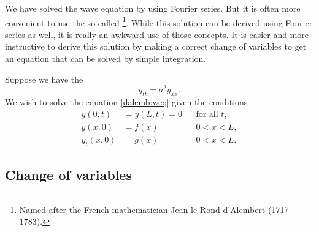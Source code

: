 
We have solved the wave equation by using Fourier series.  But it is often
more convenient to use the so-called
\emph{}%
\footnote{Named after the French mathematician
\href{http://en.wikipedia.org/wiki/D\%27Alembert}{Jean le Rond d'Alembert}
(1717--1783).}.
While this solution can be derived using Fourier series as well, it
is really an awkward use of those concepts.  It is easier and more
instructive to derive this
solution by making a correct change of variables to get an equation that
can be solved by simple integration.

Suppose we have the 
\begin{equation} \label{dalemb:weq}
y_{tt} = a^2 y_{xx} .
\end{equation}
We wish to solve the equation \eqref{dalemb:weq} given the conditions
\begin{equation} \label{dalemb:weqside}
\begin{aligned}
y(0,t) &=  y(L,t) = 0 &
& \text{for all } t , \\
y(x,0) &= f(x) &  & 0 < x < L , \\
y_t(x,0) &= g(x) &  & 0 < x < L .
\end{aligned}
\end{equation}

\subsection{Change of variables}

